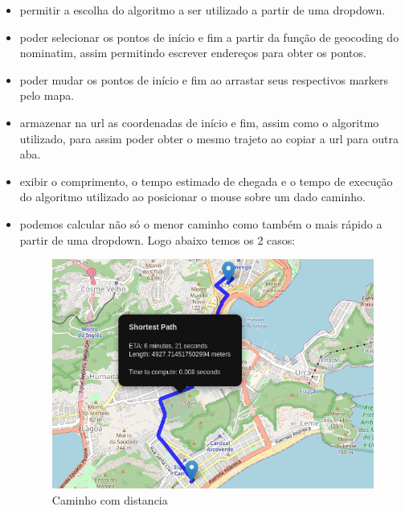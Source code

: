 \documentclass{article}
\begin{document}
\begin{itemize}
    \item permitir a escolha do algoritmo a ser utilizado a partir de uma dropdown.
    
    \item poder selecionar os pontos de início e fim a partir da função de geocoding do nominatim, assim permitindo escrever endereços para obter os pontos.
    
    \item poder mudar os pontos de início e fim ao arrastar seus respectivos markers pelo mapa.
    
    \item armazenar na url as coordenadas de início e fim, assim como o algoritmo utilizado, para assim poder obter o mesmo trajeto ao copiar a url para outra aba.
    
    \item exibir o comprimento, o tempo estimado de chegada e o tempo de execução do algoritmo utilizado ao posicionar o mouse sobre um dado caminho.
    
    \item podemos calcular não só o menor caminho como também o mais rápido a partir de uma dropdown. Logo abaixo temos os 2 casos:
    
\begin{figure}[H]
    \centering
    \includegraphics[scale=0.65]{EDA_path_with_shortest_path.png}
    \caption{Caminho com distancia}
    \label{fig:my_label}
\end{figure}


\end{itemize}
\end{document}
